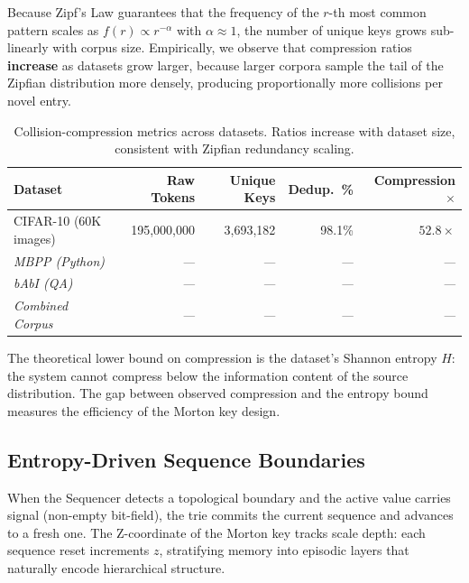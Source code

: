 Because Zipf's Law guarantees that the frequency of the $r$-th most common
pattern scales as $f(r) \propto r^{-\alpha}$ with $\alpha \approx 1$,
the number of unique keys grows sub-linearly with corpus size.
Empirically, we observe that compression ratios \textbf{increase} as
datasets grow larger, because larger corpora sample the tail of the
Zipfian distribution more densely, producing proportionally more
collisions per novel entry.

\begin{table}[h]
  \centering
  \caption{Collision-compression metrics across datasets.  Ratios increase
           with dataset size, consistent with Zipfian redundancy scaling.}
  \label{tab:compression_metrics}
  \begin{tabular}{lrrrr}
    \toprule
    \textbf{Dataset}
      & \textbf{Raw Tokens}
      & \textbf{Unique Keys}
      & \textbf{Dedup.\ \%}
      & \textbf{Compression $\times$} \\
    \midrule
    CIFAR-10 (60K images)
      & 195,000,000
      & 3,693,182
      & 98.1\%
      & $52.8\times$ \\
    \addlinespace
    \textit{MBPP (Python)}
      & \textit{---}
      & \textit{---}
      & \textit{---}
      & \textit{---} \\
    \textit{bAbI (QA)}
      & \textit{---}
      & \textit{---}
      & \textit{---}
      & \textit{---} \\
    \textit{Combined Corpus}
      & \textit{---}
      & \textit{---}
      & \textit{---}
      & \textit{---} \\
    \bottomrule
  \end{tabular}
\end{table}

\noindent The theoretical lower bound on compression is the dataset's
Shannon entropy $H$: the system cannot compress below the information
content of the source distribution.  The gap between observed compression
and the entropy bound measures the efficiency of the Morton key design.

\subsection{Entropy-Driven Sequence Boundaries}
\label{sec:sequence_boundaries}

When the Sequencer detects a topological boundary and the active value
carries signal (non-empty bit-field), the trie commits the current
sequence and advances to a fresh one.  The Z-coordinate of the Morton key
tracks scale depth: each sequence reset increments $z$, stratifying memory
into episodic layers that naturally encode hierarchical structure.
